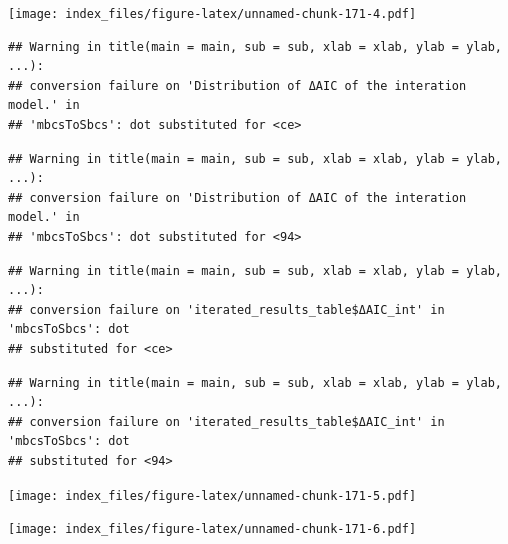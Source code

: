 \documentclass[
]{article}
\newenvironment{Shaded}{\begin{snugshade}}{\end{snugshade}}
\newcommand{\AttributeTok}[1]{\textcolor[rgb]{0.77,0.63,0.00}{#1}}
\newcommand{\FunctionTok}[1]{\textcolor[rgb]{0.00,0.00,0.00}{#1}}
\newcommand{\NormalTok}[1]{#1}
\newcommand{\SpecialCharTok}[1]{\textcolor[rgb]{0.00,0.00,0.00}{#1}}
\newcommand{\StringTok}[1]{\textcolor[rgb]{0.31,0.60,0.02}{#1}}
\begin{document}
\texttt{[image: index\_files/figure-latex/unnamed-chunk-171-4.pdf]}

\begin{Shaded}
\end{Shaded}

\begin{verbatim}
## Warning in title(main = main, sub = sub, xlab = xlab, ylab = ylab, ...):
## conversion failure on 'Distribution of ΔAIC of the interation model.' in
## 'mbcsToSbcs': dot substituted for <ce>
\end{verbatim}

\begin{verbatim}
## Warning in title(main = main, sub = sub, xlab = xlab, ylab = ylab, ...):
## conversion failure on 'Distribution of ΔAIC of the interation model.' in
## 'mbcsToSbcs': dot substituted for <94>
\end{verbatim}

\begin{verbatim}
## Warning in title(main = main, sub = sub, xlab = xlab, ylab = ylab, ...):
## conversion failure on 'iterated_results_table$ΔAIC_int' in 'mbcsToSbcs': dot
## substituted for <ce>
\end{verbatim}

\begin{verbatim}
## Warning in title(main = main, sub = sub, xlab = xlab, ylab = ylab, ...):
## conversion failure on 'iterated_results_table$ΔAIC_int' in 'mbcsToSbcs': dot
## substituted for <94>
\end{verbatim}

\texttt{[image: index\_files/figure-latex/unnamed-chunk-171-5.pdf]}

\begin{Shaded}
\end{Shaded}

\texttt{[image: index\_files/figure-latex/unnamed-chunk-171-6.pdf]}
\end{document}
